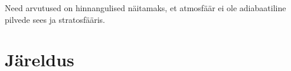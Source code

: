 \documentclass{trkut}%
\begin{document}
Need arvutused on hinnangulised näitamaks, et atmosfäär ei ole adiabaatiline pilvede sees ja stratosfääris.


\section{Järeldus}








\nocite{*}
\printbibliography


\kinnitusleht%
\end{document}
